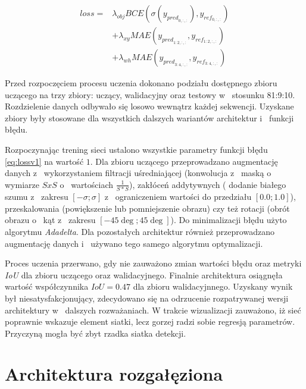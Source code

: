 \begin{equation}
\begin{aligned}
loss =& \lambda_{obj} BCE(\sigma(y_{pred}_{0,:,:}), y_{ref}_{0,:,:}) \\
&+ \lambda_{xy}MAE(y_{pred}_{1:2,:,:}, y_{ref}_{1:2,:,:})\\
&+ \lambda_{wh}MAE(y_{pred}_{3:4,:,:},y_{ref}_{3:4,:,:}) 
\end{aligned}
\label{eq:lossv1}
\end{equation}


Przed rozpoczęciem procesu uczenia dokonano podziału dostępnego zbioru uczącego na trzy zbiory: uczący, walidacyjny oraz testowy w~ stosunku 81:9:10. 
Rozdzielenie danych odbywało się losowo wewnątrz każdej sekwencji.
Uzyskane zbiory były stosowane dla wszystkich dalszych wariantów architektur i~ funkcji błędu.

Rozpoczynając trening sieci ustalono wszystkie parametry funkcji błędu \eqref{eq:lossv1} na wartość $1$.
Dla zbioru uczącego przeprowadzano augmentację danych z~ wykorzystaniem filtracji uśredniającej (konwolucja z~ maską o~ wymiarze $SxS$ o~ wartościach $\frac{1}{S*S}$), zakłóceń addytywnych ( dodanie białego szumu z~ zakresu $[-\sigma;\sigma]$ z~ ograniczeniem wartości do przedziału $[0.0;1.0]$), przeskalowania (powiększenie lub pomniejszenie obrazu) czy też rotacji (obrót obrazu o~ kąt z~ zakresu $[-45\deg;45\deg]$).
Do minimalizacji błędu użyto algorytmu \emph{Adadelta}.
Dla pozostałych architektur również przeprowadzano augmentację danych i~ używano tego samego algorytmu optymalizacji.

Proces uczenia przerwano, gdy nie zauważono zmian wartości błędu oraz metryki \emph{IoU} dla zbioru uczącego oraz walidacyjnego.
Finalnie architektura osiągnęła wartość współczynnika $IoU = 0.47$ dla zbioru walidacyjnnego.
Uzyskany wynik był niesatysfakcjonujący, zdecydowano się na odrzucenie rozpatrywanej wersji architektury w~ dalszych rozważaniach.
W trakcie wizualizacji zauważono, iż sieć poprawnie wskazuje element siatki, lecz gorzej radzi sobie regresją parametrów.
Przyczyną mogła być zbyt rzadka siatka detekcji.

\section{Architektura rozgałęziona}

